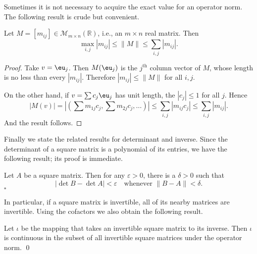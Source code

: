 \documentclass[11pt]{article}
\begin{document}
Sometimes it is not necessary to acquire the exact value for an operator norm.
The following result is crude but convenient.

\begin{prop}
  Let $M = [m_{ij}] \in \mathcal{M}_{m \times n}(\mathbb{R})$, i.e., an $m \times n$ real matrix.
  Then
  \[
    \max_{i,j} |m_{ij}| \leqslant \| M \| \leqslant \sum_{i,j} |m_{ij}|.
  \]
\end{prop}

\begin{proof}
  Take $v = \eu_j$.
  Then $M(\eu_j)$ is the $j^\text{th}$ column vector of $M$, whose length is no less than every $|m_{ij}|$.
  Therefore $|m_{ij}| \leqslant \| M \|$ for all $i,j$.

  On the other hand, if $v = \sum c_j \eu_j$ has unit length, the $|c_j| \leqslant 1$ for all $j$.
  Hence
  \[
    |M(v)| = \left| \left( \sum m_{1j} c_j, \sum m_{2j} c_j, \dots \right) \right| 
    \leqslant \sum_{i,j} |m_{ij} c_j| \leqslant \sum_{i,j} |m_{ij}|.
  \]
  And the result follows.
\end{proof}

Finally we state the related results for determinant and inverse.
Since the determinant of a square matrix is a polynomial of its entries,
we have the following result; its proof is immediate.

\begin{thm}
  Let $A$ be a square matrix.
  Then for any $\varepsilon > 0$, there is a $\delta > 0$ such that
  \[
    | \det B - \det A | < \varepsilon \quad \text{whenever $\| B - A \| < \delta$.}
  \] \hfill$\square$
\end{thm}

In particular, if a square matrix is invertible, all of its nearby matrices are invertible.
Using the cofactors we also obtain the following result.

\begin{thm}
  Let $\iota$ be the mapping that takes an invertible square matrix to its inverse.
  Then $\iota$ is continuous in the subset of all invertible square matrices under the operator norm.
  \qed
\end{thm}
\end{document}
